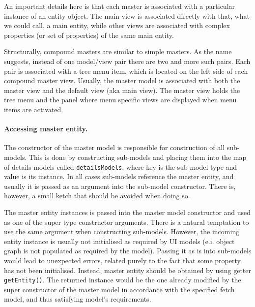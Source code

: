   An important details here is that each master is associated with a particular instance of an entity object.
  The main view is associated directly with that, what we could call, a main entity, while other views are associated with complex properties (or set of properties) of the same main entity.
  
  Structurally, compound masters are similar to simple masters.
  As the name suggests, instead of one model/view pair there are two and more such pairs.
  Each pair is associated with a tree menu item, which is located on the left side of each compound master view.
  Usually, the master model is associated with both the master view and the default view (aka main view).
  The master view holds the tree menu and the panel where menu specific views are displayed when menu items are activated.
  

  \paragraph{Accessing master entity.} 
  The constructor of the master model is responsible for construction of all sub-models.
  This is done by constructing sub-models and placing them into the map of details models called \texttt{detailsModels}, where key is the sub-model type and value is its instance.
  In all cases sub-models reference the master entity, and usually it is passed as an argument into the sub-model constructor.  
  There is, however, a small ketch that should be avoided when doing so.
  
  The master entity instances is passed into the master model constructor and used as one of the super type constructor arguments.
  There is a natural temptation to use the same argument when constructing sub-models.
  However, the incoming entity instance is usually not initialised as required by UI models (e.i. object graph is not populated as required by the model).
  Passing it as is into sub-models would lead to unexpected errors, related purely to the fact that some property has not been initialised.
  Instead, master entity should be obtained by using getter \texttt{getEntity()}.
  The returned instance would be the one already modified by the super constructor of the master model in accordance with the specified fetch model, and thus satisfying model's requirements.
  
  


